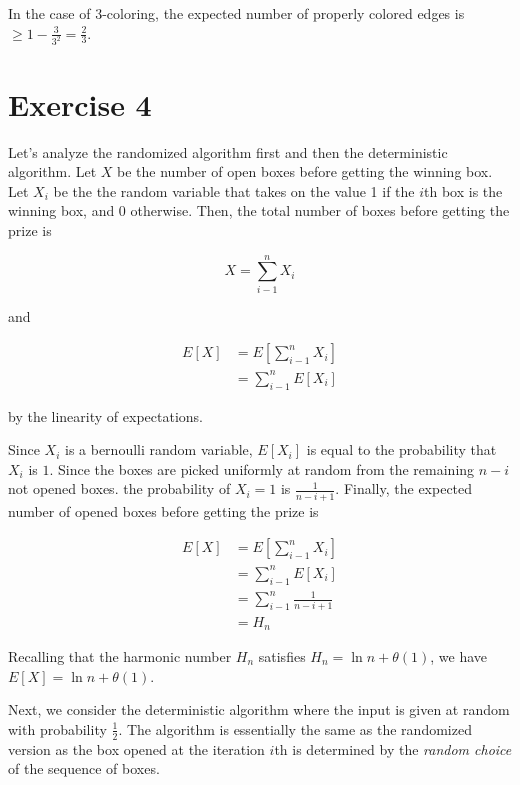 \documentclass[12pt, a4paper]{article} %
\begin{document}
In the case of $3$-coloring, the expected number of properly colored edges is $\ge 1 - \frac{3}{3^{2}} = \frac{2}{3}$.


\section*{Exercise 4}%
\label{sec:exercise_4}

Let's analyze the randomized algorithm first and then the deterministic algorithm. Let $X$ be the number of open boxes before getting the winning box. Let $X_{i}$ be the the random variable that takes on the value 1 if the $i$th box is the winning box, and 0 otherwise. Then, the total number of boxes before getting the prize is

\begin{equation*}
  X = \sum_{i-1}^{n}X_{i}
\end{equation*}

and

\begin{align*}
  E[X] &= E[\sum_{i-1}^{n}X_{i}] \\
       &= \sum_{i-1}^{n}E[X_{i}]
\end{align*}

by the linearity of expectations.

Since $X_{i}$ is a bernoulli random variable, $E[X_{i}]$ is equal to the probability that $X_{i}$ is $1$.
Since the boxes are picked uniformly at random from the remaining $n - i$ not opened boxes. the probability of $X_{i} = 1$ is $\frac{1}{n-i+1}$. Finally, the expected number of opened boxes before getting the prize is

\begin{align*}
  E[X] &= E[\sum_{i-1}^{n}X_{i}] \\
       &= \sum_{i-1}^{n}E[X_{i}] \\
       &= \sum_{i-1}^{n} \frac{1}{n-i+1} \\
       &= H_{n}
\end{align*}

Recalling that the harmonic number $H_{n}$ satisfies $H_{n} = \ln n + \theta(1)$, we have $E[X] = \ln n + \theta(1)$.

Next, we consider the deterministic algorithm where the input is given at random with probability $\frac{1}{2}$. The algorithm is essentially the same as the randomized version as the box opened at the iteration $i$th is determined by the \textit{random choice} of the sequence of boxes.


% 
\end{document}
